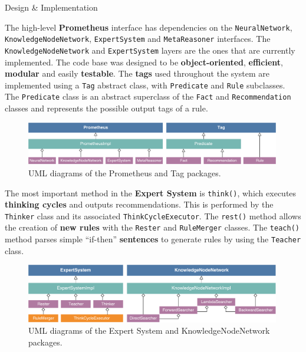 \documentclass[final]{beamer} %
\newcommand{\code}[1]{\texttt{#1}}
\begin{document}
\begin{frame}
\begin{columns}
\begin{column}{.33\textwidth}
{				\begin{block}{Design \& Implementation}
					\parbox{0.99\textwidth}{
					The high-level \textbf{Prometheus} interface has dependencies on the \code{NeuralNetwork}, \code{KnowledgeNodeNetwork}, \code{ExpertSystem} and \code{MetaReasoner} interfaces. The \code{KnowledgeNodeNetwork} and \code{ExpertSystem} layers are the ones that are currently implemented. The code base was designed to be \textbf{object-oriented}, \textbf{efficient}, \textbf{modular} and easily \textbf{testable}. The \textbf{tags} used throughout the system are implemented using a \code{Tag} abstract class, with \code{Predicate} and \code{Rule} subclasses. The \code{Predicate} class is an abstract superclass of the \code{Fact} and \code{Recommendation} classes and represents the possible output tags of a rule.}
				
					\begin{figure}
						\centering
						\includegraphics[width=0.99\textwidth]{figures/uml_combined_1.pdf}
						\caption{UML diagrams of the Prometheus and Tag packages.}
					\end{figure}			
				
					\parbox{0.99\textwidth}{
					The most important method in the \textbf{Expert System} is \code{think()}, which executes \textbf{thinking cycles} and outputs recommendations. This is performed by the \code{Thinker} class and its associated \code{ThinkCycleExecutor}. The \code{rest()} method allows the creation of \textbf{new rules} with the \code{Rester} and \code{RuleMerger} classes. The \code{teach()} method parses simple ``if-then'' \textbf{sentences} to generate rules by using the \code{Teacher} class.}
				
					\begin{figure}
						\centering
						\includegraphics[width=0.99\textwidth]{figures/uml_combined_3.pdf}
						\caption{UML diagrams of the Expert System and KnowledgeNodeNetwork packages.}
					\end{figure}
				

\end{block}}
\end{column}
\end{columns}
\end{frame}
\end{document}
